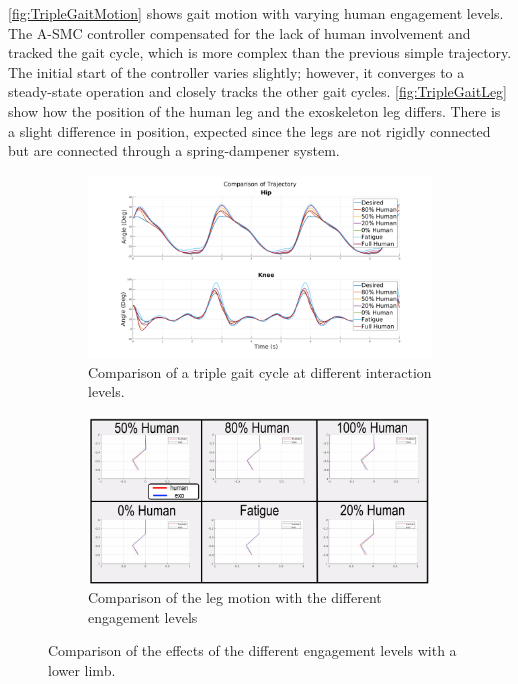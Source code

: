 \autoref{fig:TripleGaitMotion} shows gait motion with varying human engagement levels. The A-SMC controller compensated for the lack of human involvement and tracked the gait cycle, which is more complex than the previous simple trajectory. The initial start of the controller varies slightly; however, it converges to a steady-state operation and closely tracks the other gait cycles. \autoref{fig:TripleGaitLeg} show how the position of the human leg and the exoskeleton leg differs. There is a slight difference in position, expected since the legs are not rigidly connected but are connected through a spring-dampener system.  




\begin{figure}
    \centering
    \begin{subfigure}{\linewidth}
        \centering
        \includegraphics[width=\columnwidth]{images/controllers/gait/traj.png}
        \caption[Comparison of a Triple Gait Cycle]{Comparison of a triple gait cycle at different interaction levels.}
        \label{fig:TripleGaitJoint}
    \end{subfigure}
        \begin{subfigure}{\linewidth}
        \centering
        \includegraphics[width=\columnwidth]{images/controllers/gait/leg_frame_annotated.png}
        \caption[Engagement Levels of Leg Motion]{Comparison of the leg motion with the different engagement levels}
        \label{fig:TripleGaitLeg}
    \end{subfigure}
    \caption[Effects of the Different Engagement Levels]{Comparison of the effects of the different engagement levels with a lower limb.}
    \label{fig:TripleGaitMotion}
\end{figure}








